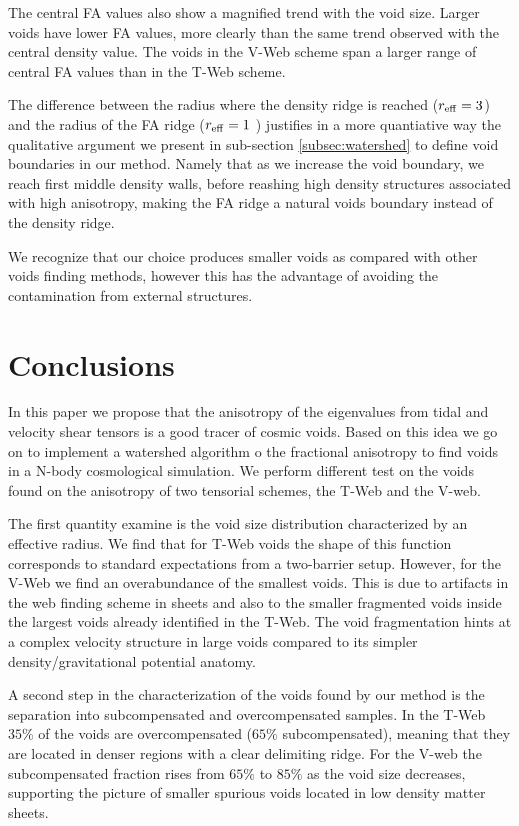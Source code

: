 \documentclass[a4,useAMS,usenatbib,usegraphicx]{mn2e}
\begin{document}
The central FA values also show a magnified trend with the void size. 
Larger voids have lower FA values, more clearly than the same trend
observed with the central density value. 
The voids in the V-Web scheme span a larger range of central FA values
than in the T-Web scheme. 

The difference between the radius where the density ridge is reached 
($r_{\rm eff}=3$) and the radius of the FA  ridge ($r_{\rm eff}=1$ )
justifies in a more quantiative way the qualitative argument
we present in sub-section \ref{subsec:watershed} to define void boundaries in
our method.  Namely that as we increase the void boundary, we reach
first middle density walls, before reashing high density structures
associated with high anisotropy, making the FA  ridge a  natural voids
boundary instead of the density ridge.  

We recognize that our choice produces smaller voids as compared with
other voids finding methods, however this has the advantage of
avoiding the contamination from external structures.


\section{Conclusions}
\label{sec:conclusions}

In this paper we propose that the anisotropy of the eigenvalues from
tidal and velocity shear tensors is a good tracer of  cosmic voids. 
Based on this idea we go on to implement a watershed
algorithm o the fractional anisotropy to find voids in a N-body
cosmological simulation.
We perform different test on the voids found on the anisotropy of two
tensorial schemes, the T-Web and the V-web.  

The first quantity examine is the void size distribution
characterized by an effective radius. 
We find that for T-Web voids the shape of this function corresponds to
standard expectations from a two-barrier setup. 
However, for the V-Web we find an overabundance of the smallest voids.
This is due to artifacts in the web finding scheme in sheets and also
to the smaller fragmented voids inside the largest voids already
identified in the T-Web. 
The void fragmentation hints at a complex velocity structure in large
voids compared to its simpler density/gravitational potential anatomy.  

A second step in the characterization of the voids found by our method
is the separation into subcompensated and overcompensated samples. 
In the T-Web $35\%$ of the voids are overcompensated ($65\%$
subcompensated), meaning that they are located in denser regions with
a clear delimiting ridge.   
For the V-web the subcompensated fraction rises from $65\%$ to $85\%$ as the
void size decreases, supporting the picture of smaller spurious voids
located in low density matter sheets.   
\end{document}
